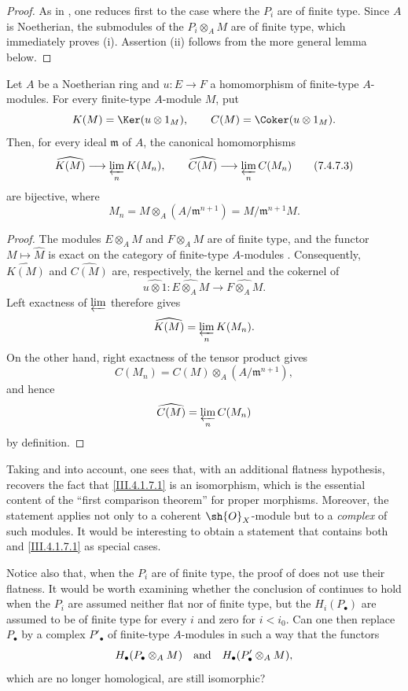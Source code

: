\begin{proof}
As in , one reduces first to the case where the
$P_i$ are of finite type.  Since $A$ is Noetherian, the
submodules of the $P_i\otimes_A M$ are of finite type, which
immediately proves (i).  Assertion (ii) follows from the more
general lemma below.
\end{proof}

\begin{lemma}[7.4.7.2]
\label{III.7.4.7.2}
Let $A$ be a Noetherian ring and $u:E\to F$ a homomorphism of
finite-type $A$-modules.  For every finite-type $A$-module
$M$, put
\[
  K(M)=\Ker(u\otimes 1_M),
  \qquad
  C(M)=\Coker(u\otimes 1_M).
\]
Then, for every ideal $\mathfrak m$ of $A$, the canonical
homomorphisms
\[
  \widehat{K(M)}
  \longrightarrow
  \varprojlim_n K(M_n),
  \qquad
  \widehat{C(M)}
  \longrightarrow
  \varprojlim_n C(M_n)
  \tag{7.4.7.3}\label{III.7.4.7.3.eq}
\]
are bijective, where
\[
  M_n
  =
  M\otimes_A(A/\mathfrak m^{n+1})
  =
  M/\mathfrak m^{n+1}M.
\]
\end{lemma}

\begin{proof}
The modules $E\otimes_A M$ and $F\otimes_A M$ are of finite
type, and the functor $M\mapsto\widehat{M}$ is exact on the
category of finite-type $A$-modules .
Consequently, $\widehat{K(M)}$ and $\widehat{C(M)}$ are,
respectively, the kernel and the cokernel of
\[
  \widehat{u\otimes 1}:
  \widehat{E\otimes_A M}
  \longrightarrow
  \widehat{F\otimes_A M}.
\]
Left exactness of $\varprojlim$ therefore gives
\[
  \widehat{K(M)}
  =
  \varprojlim_n K(M_n).
\]
On the other hand, right exactness of the tensor product gives
\[
  C(M_n)
  =
  C(M)\otimes_A(A/\mathfrak m^{n+1}),
\]
and hence
\[
  \widehat{C(M)}
  =
  \varprojlim_n C(M_n)
\]
by definition.
\end{proof}

\begin{remark}[7.4.8]
\label{III.7.4.8}
Taking  and  into account,
one sees that, with an additional flatness hypothesis,
 recovers the fact that
\eqref{III.4.1.7.1} is an isomorphism, which is the
essential content of the ``first comparison theorem'' for
proper morphisms.  Moreover, the statement applies not only
to a coherent $\sh{O}_X$-module but to a \emph{complex} of
such modules.  It would be interesting to obtain a statement
that contains both  and
\eqref{III.4.1.7.1} as special cases.

Notice also that, when the $P_i$ are of finite type, the proof
of  does not use their flatness.  It would be
worth examining whether the conclusion of 
continues to hold when the $P_i$ are assumed neither flat nor
of finite type, but the $H_i(P_\bullet)$ are assumed to be of
finite type for every $i$ and zero for $i<i_0$.  Can one then
replace $P_\bullet$ by a complex $P'_\bullet$ of finite-type
$A$-modules in such a way that the functors
\[
  H_\bullet(P_\bullet\otimes_A M)
  \quad\hbox{and}\quad
  H_\bullet(P'_\bullet\otimes_A M),
\]
which are no longer homological, are still isomorphic?
\end{remark}
